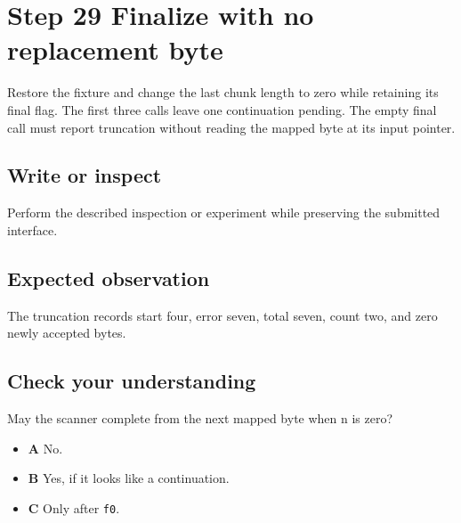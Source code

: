 \section{Step 29 Finalize with no replacement byte}\label{utf8-s29}

Restore the fixture and change the last chunk length to zero while retaining its final flag. The first three calls leave one continuation pending. The empty final call must report truncation without reading the mapped byte at its input pointer.

\subsection{Write or inspect}
Perform the described inspection or experiment while preserving the submitted interface.

\subsection{Expected observation}
The truncation records start four, error seven, total seven, count two, and zero newly accepted bytes.

\subsection{Check your understanding}
May the scanner complete from the next mapped byte when n is zero?

\begin{itemize}
  \item \textbf{A} No.
  \item \textbf{B} Yes, if it looks like a continuation.
  \item \textbf{C} Only after \texttt{f0}.
\end{itemize}

